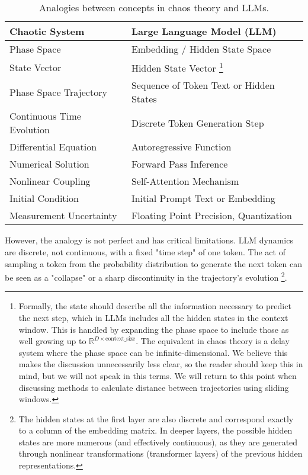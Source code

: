 \documentclass[a4paper,12pt]{article}
\begin{document}
\begin{table}[H]
\centering
\begin{tabular}{@{}ll@{}}
\toprule
\textbf{Chaotic System} & \textbf{Large Language Model (LLM)} \\ \midrule
Phase Space & Embedding / Hidden State Space \\
State Vector & Hidden State Vector \footnote{Formally, the state should describe all the information necessary to predict the next step, which in LLMs includes all the hidden states in the context window. This is handled by expanding the phase space to include those as well growing up to $\mathbb{R}^{D \times \text{context\_size}}$. The equivalent in chaos theory is a delay system where the phase space can be infinite-dimensional. We believe this makes the discussion unnecessarily less clear, so the reader should keep this in mind, but we will not speak in this terms. We will return to this point when discussing methods to calculate distance between trajectories using sliding windows.} \\ %
Phase Space Trajectory & Sequence of Token Text or Hidden States \\
Continuous Time Evolution & Discrete Token Generation Step \\
Differential Equation & Autoregressive Function \\
Numerical Solution & Forward Pass Inference \\
Nonlinear Coupling & Self-Attention Mechanism \\
Initial Condition & Initial Prompt Text or Embedding \\
Measurement Uncertainty & Floating Point Precision, Quantization \\ \bottomrule
\end{tabular}
\caption{Analogies between concepts in chaos theory and LLMs.}
\label{tab:analogy}
\end{table}


However, the analogy is not perfect and has critical limitations. LLM dynamics are discrete, not continuous, with a fixed "time step" of one token. The act of sampling a token from the probability distribution to generate the next token can be seen as a "collapse" or a sharp discontinuity in the trajectory's evolution \footnote{The hidden states at the first layer are also discrete and correspond exactly to a column of the embedding matrix. In deeper layers, the possible hidden states are more numerous (and effectively continuous), as they are generated through nonlinear transformations (transformer layers) of the previous hidden representations.}.
\end{document}
